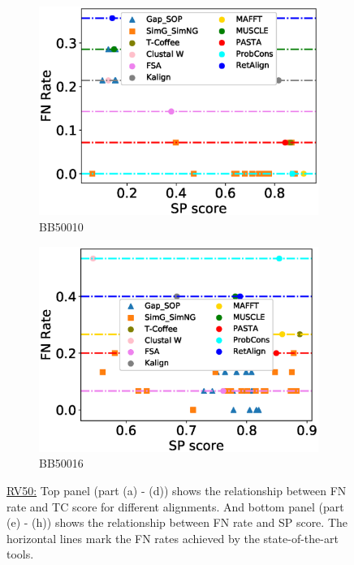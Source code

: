 \begin{figure}[!htbp]
\begin{adjustwidth}{-1cm}{-1cm}
\begin{subfigure}{0.22\textwidth}
			\includegraphics[width=\columnwidth]{Figure/summary/precomputedInit/Balibase/BB50010_fnrate_vs_sp_2}
			\caption{BB50010}
		\end{subfigure}
		\begin{subfigure}{0.22\textwidth}
			\includegraphics[width=\columnwidth]{Figure/summary/precomputedInit/Balibase/BB50016_fnrate_vs_sp_2}
			\caption{BB50016}
		\end{subfigure}	
		\end{adjustwidth}
		\caption[FN rate vs TC score on RV50]{\underline{RV50:} Top panel (part (a) - (d)) shows the relationship between FN rate and TC score for different alignments. And bottom panel (part (e) - (h)) shows the relationship between FN rate and SP score. The horizontal lines mark the FN rates achieved by the state-of-the-art tools.}
		\label{fig:rv50_fnrate_vs_tc}
\end{figure}







